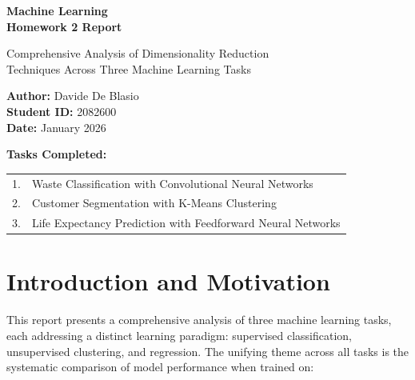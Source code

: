 \documentclass[11pt,a4paper]{article}
\begin{document}
\begin{titlepage}
    \centering
    \vspace*{2cm}
    
    {\Huge\bfseries Machine Learning\\[0.5cm]Homework 2 Report\par}
    
    \vspace{2cm}
    
    {\Large Comprehensive Analysis of Dimensionality Reduction\\Techniques Across Three Machine Learning Tasks\par}
    
    \vspace{3cm}
    
    {\large\textbf{Author:} Davide De Blasio\\[0.3cm]
    \textbf{Student ID:} 2082600\\[0.3cm]
    \textbf{Date:} January 2026\par}
    
    \vfill
    
    {\large
    \textbf{Tasks Completed:}\\[0.5cm]
    \begin{tabular}{ll}
        1. & Waste Classification with Convolutional Neural Networks\\
        2. & Customer Segmentation with K-Means Clustering\\
        3. & Life Expectancy Prediction with Feedforward Neural Networks\\
    \end{tabular}
    \par}
    
    \vspace{1cm}
    
\end{titlepage}

\tableofcontents
\newpage

\section{Introduction and Motivation}

This report presents a comprehensive analysis of three machine learning tasks, each addressing a distinct learning paradigm: supervised classification, unsupervised clustering, and regression. The unifying theme across all tasks is the systematic comparison of model performance when trained on:
\end{document}
